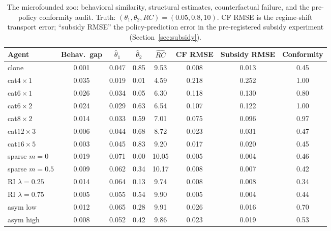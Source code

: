 \documentclass[11pt]{article}
\newcommand{\rhat}{\widehat{RC}}
\newcommand{\that}[1]{\widehat{\theta}_{#1}}
\begin{document}
\begin{table}[t]
\centering\small
\caption{The microfounded zoo: behavioral similarity, structural estimates,
counterfactual failure, and the pre-policy conformity audit. Truth:
$(\theta_1,\theta_2,RC) = (0.05, 0.8, 10)$. CF RMSE is the regime-shift
transport error; ``subsidy RMSE'' the policy-prediction error in the
pre-registered subsidy experiment (Section~\ref{sec:subsidy}).}
\label{tab:zoo}
\begin{tabular}{lccccccc}
\toprule
Agent & Behav.\ gap & $\that{1}$ & $\that{2}$ & $\rhat$ & CF RMSE &
Subsidy RMSE & Conformity \\
\midrule
clone        & 0.001 & 0.047 & 0.85 & 9.53  & 0.008 & 0.013 & 0.45 \\
cat$4{\times}1$  & 0.035 & 0.019 & 0.01 & 4.59  & 0.218 & 0.252 & 1.00 \\
cat$6{\times}1$  & 0.026 & 0.034 & 0.05 & 6.30  & 0.118 & 0.130 & 0.80 \\
cat$6{\times}2$  & 0.024 & 0.029 & 0.63 & 6.54  & 0.107 & 0.122 & 1.00 \\
cat$8{\times}2$  & 0.014 & 0.033 & 0.59 & 7.01  & 0.075 & 0.096 & 0.97 \\
cat$12{\times}3$ & 0.006 & 0.044 & 0.68 & 8.72  & 0.023 & 0.031 & 0.47 \\
cat$16{\times}5$ & 0.003 & 0.045 & 0.83 & 9.20  & 0.017 & 0.020 & 0.45 \\
sparse $m{=}0$   & 0.019 & 0.071 & 0.00 & 10.05 & 0.005 & 0.004 & 0.46 \\
sparse $m{=}0.5$ & 0.009 & 0.062 & 0.34 & 10.17 & 0.008 & 0.007 & 0.42 \\
RI $\lambda{=}0.25$ & 0.014 & 0.064 & 0.13 & 9.74 & 0.008 & 0.008 & 0.34 \\
RI $\lambda{=}0.75$ & 0.005 & 0.055 & 0.54 & 9.90 & 0.005 & 0.004 & 0.44 \\
asym low     & 0.012 & 0.065 & 0.28 & 9.91  & 0.026 & 0.016 & 0.70 \\
asym high    & 0.008 & 0.052 & 0.42 & 9.86  & 0.023 & 0.019 & 0.53 \\
\bottomrule
\end{tabular}
\end{table}
\end{document}
